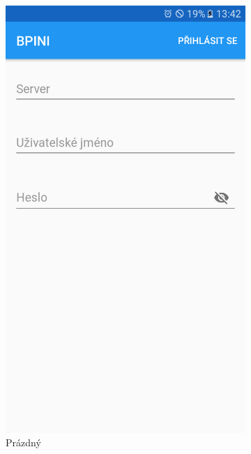 \documentclass[czech,BP]{thesiskiv}
\begin{document}
\begin{figure}[H]
	\centering
  \begin{subfigure}[b]{0.3\textwidth}
    \centering
	\includegraphics[width=\textwidth]{../images/client_android/Screenshot_20170610-134211.png}	
	\caption{Prázdný}
	\label{fig:Screenshot_20170610-134211}
  \end{subfigure}
  \begin{subfigure}[b]{0.3\textwidth}
    \centering

\end{subfigure}
\end{figure}
\end{document}
